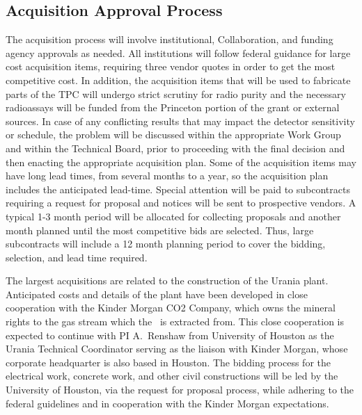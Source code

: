 \subsection{Acquisition Approval Process}

The acquisition process will involve institutional, Collaboration, and funding agency approvals as needed. All institutions will follow federal guidance for large cost acquisition items, requiring three vendor quotes in order to get  the most competitive cost. In addition, the acquisition items that will be used to fabricate parts of the TPC will undergo strict scrutiny for radio purity and the necessary radioassays will be funded from the Princeton portion of the grant or external sources. In case of any conflicting results that may impact the detector sensitivity or schedule, the problem will be discussed within the appropriate Work Group and within the Technical Board, prior to proceeding with the final decision and then enacting the appropriate acquisition plan.  Some of the acquisition items may have long lead times, from several months to a year, so the acquisition plan includes the anticipated lead-time.  Special attention will be paid to subcontracts requiring a request for proposal and notices will be sent to prospective vendors. A typical 1-3 month period will be allocated for collecting proposals and another month planned until the most competitive bids are selected. Thus, large subcontracts will include a 12 month planning period to cover the bidding, selection, and lead time required. 

The largest acquisitions are related to the construction of the Urania plant. Anticipated costs and details of the plant have been developed in close cooperation with the Kinder Morgan CO2 Company, which owns the mineral rights to the gas stream which the \UAr\ is extracted from. This close cooperation is expected to continue with PI A.~Renshaw from University of Houston as the Urania Technical Coordinator serving as the liaison with Kinder Morgan, whose corporate headquarter is also based in Houston.  The bidding process for the electrical work, concrete work, and other civil constructions will be led by the University of Houston, via the request for proposal process, while adhering to the federal guidelines and in cooperation with the Kinder Morgan expectations. 


